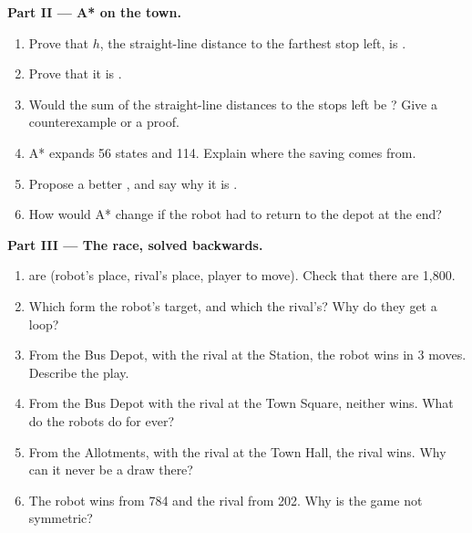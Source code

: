\begin{problem}
\medskip\noindent\textbf{Part II --- A* on the town.}\par\nopagebreak
\begin{enumerate}[resume, beginpenalty=10000]
\item Prove that $h$, the straight-line distance to the farthest stop left, is .
\item Prove that it is .
\item Would the sum of the straight-line distances to the stops left be ? Give a counterexample or a proof.
\item A* expands 56 states and  114. Explain where the saving comes from.
\item Propose a better , and say why it is .
\item How would A* change if the robot had to return to the depot at the end?
\end{enumerate}

\medskip\noindent\textbf{Part III --- The race, solved backwards.}\par\nopagebreak
\begin{enumerate}[resume, beginpenalty=10000]
\item {} are (robot's place, rival's place, player to move). Check that there are 1,800.
\item Which  form the robot's target, and which the rival's? Why do they get a loop?
\item From the Bus Depot, with the rival at the Station, the robot wins in 3 moves. Describe the play.
\item From the Bus Depot with the rival at the Town Square, neither wins. What do the robots do for ever?
\item From the Allotments, with the rival at the Town Hall, the rival wins. Why can it never be a draw there?
\item The robot wins from 784  and the rival from 202. Why is the game not symmetric?
\end{enumerate}


\end{problem}
